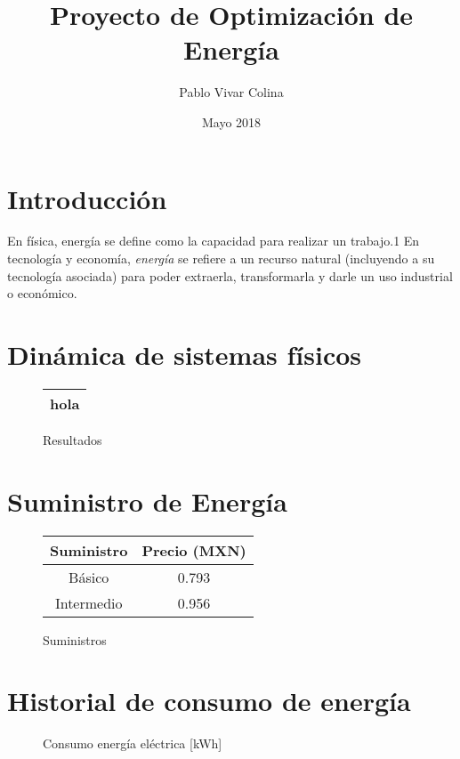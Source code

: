 \documentclass[]{article}
\title{Proyecto de Optimización de Energía}
\author{Pablo Vivar Colina}
\date{Mayo 2018}
\begin{document}
\maketitle

\section{Introducción}

En física, energía se define como la capacidad para realizar un trabajo.1​ En tecnología y economía, \textit{energía} se refiere a un recurso natural (incluyendo a su tecnología asociada) para poder extraerla, transformarla y darle un uso industrial o económico.\cite{EnergiaWiki}\\



\section{Dinámica de sistemas físicos}


\begin{figure}[h!]
	\begin{tabular}[]{|c|}
		\hline
		hola \\
		\hline
	\end{tabular}
\label{tabla}
\caption{Resultados}
\end{figure}


\section{Suministro de Energía
}


\begin{figure}[h!]
	\centering
	\begin{tabular}[]{|c|c|}
		\hline
		 Suministro & Precio (MXN)\\
		 	\hline
		 Básico & 0.793 \\
		 Intermedio & 0.956 \\
		\hline
	\end{tabular}
	\label{cuadro:suministros}
	\caption{Suministros}
	
\end{figure}



\section{Historial de consumo de energía}

\begin{figure}[h!]
	\centering
{}
\caption{Consumo energía eléctrica [kWh]}
\end{figure}
\end{document}
